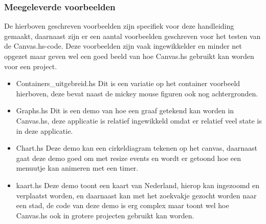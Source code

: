 

\subsubsection{Meegeleverde voorbeelden}
De hierboven geschreven voorbeelden zijn specifiek voor deze handleiding gemaakt, daarnaast zijn er een aantal voorbeelden geschreven voor het testen van de Canvas.hs-code. Deze voorbeelden zijn vaak ingewikkelder en minder net opgezet maar geven wel een goed beeld van hoe Canvas.hs gebruikt kan worden voor een project.

\begin{itemize}
    \item Containers\_uitgebreid.hs
Dit is een variatie op het container voorbeeld hierboven, deze bevat naast de mickey mouse figuren ook nog achtergronden.
    \item Graphs.hs
Dit is een demo van hoe een graaf getekend kan worden in Canvas.hs, deze applicatie is relatief ingewikkeld omdat er relatief veel state is in deze applicatie.
    \item Chart.hs
Deze demo kan een cirkeldiagram tekenen op het canvas, daarnaast gaat deze demo goed om met resize events en wordt er getoond hoe een menuutje kan animeren met een timer.
    \item kaart.hs
Deze demo toont een kaart van Nederland, hierop kan ingezoomd en verplaatst worden, en daarnaast kan met het zoekvakje gezocht worden naar een stad, de code van deze demo is erg complex maar toont wel hoe Canvas.hs ook in grotere projecten gebruikt kan worden.
\end{itemize}

